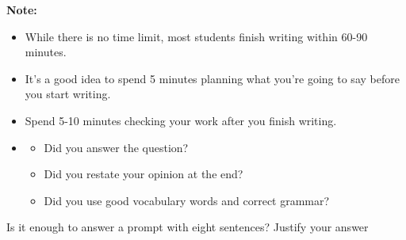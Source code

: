 \documentclass[12pt]{article}
\begin{document}
\begin{tcolorbox}[colframe=black!40, colback=gray!5, 
coltitle=black, colbacktitle=black!20, fonttitle=\bfseries\Large, 
title=Additional Notes, halign title=center, left=5pt, right=5pt, top=5pt, bottom=15pt]
\textbf{Note:}
\begin{itemize}
    \item While there is no time limit, most students finish writing within 60-90 minutes. 
    \item It's a good idea to spend 5 minutes planning what you're going to say before you start writing.
    \item Spend 5-10 minutes checking your work after you finish writing. 

    \item
    \begin{itemize}
        \item Did you answer the question?
        \item Did you restate your opinion at the end?
        \item Did you use good vocabulary words and correct grammar?
    \end{itemize}



\end{itemize}
\end{tcolorbox}

\vspace{1em}

\begin{tcolorbox}[colframe=black!60, colback=white, 
coltitle=black, colbacktitle=black!15, fonttitle=\bfseries\Large, 
title=Exit Ticket, halign title=center, left=10pt, right=10pt, top=10pt, bottom=15pt]


Is it enough to answer a prompt with eight sentences? Justify your answer 

\vspace{2em}
   \underline{\hspace{15.6cm}}  
    \\[0.8cm] \underline{\hspace{15.6cm}}  
    \\[0.8cm] \underline{\hspace{15.6cm}}




\end{tcolorbox}
\end{document}
